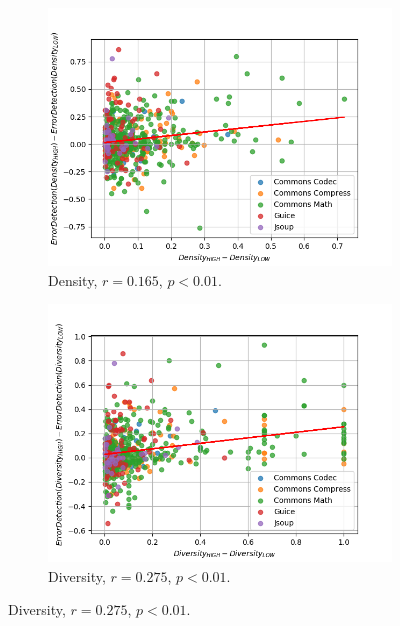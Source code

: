 \documentclass[twoside,a4paper,11pt]{memoir}
\begin{document}
\begin{figure}
    \centering
    \begin{subfigure}[b]{0.49\linewidth}
        \centering
        \includegraphics[width=\linewidth]{figures/delta_error_detection_density}
        \caption{Density, \(r=0.165 \), \(p<0.01 \).}%
        \label{fig:delta_error_detection_density}
    \end{subfigure}
    \hfill
    \begin{subfigure}[b]{0.49\linewidth}
        \centering
        \includegraphics[width=\linewidth]{figures/delta_error_detection_diversity}
        \caption{Diversity, \(r=0.275 \), \(p < 0.01 \).}%
        \label{fig:delta_error_detection_diversity}
    \end{subfigure}

\end{figure}
\end{document}
